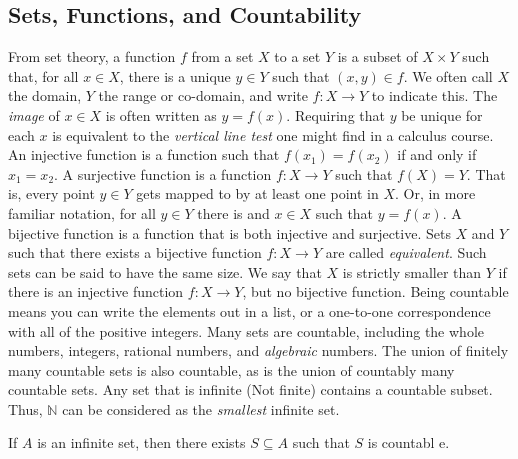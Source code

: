     \subsection{Sets, Functions, and Countability}
        From set theory, a function $f$ from a set $X$ to a
        set $Y$ is a subset of $X\times{Y}$ such that, for
        all $x\in{X}$, there is a unique $y\in{Y}$
        such that $(x,y)\in{f}$. We often call $X$ the
        domain, $Y$ the range or co-domain, and write
        $f:X\rightarrow{Y}$ to indicate this. The
        \textit{image} of $x\in{X}$ is often written
        as $y=f(x)$. Requiring that $y$ be unique for each
        $x$ is equivalent to the \textit{vertical line test}
        one might find in a calculus course.
        An injective function is a function such
        that $f(x_{1})=f(x_{2})$ if and only if $x_{1}=x_{2}$.
        A surjective function is a function $f:X\rightarrow{Y}$
        such that $f(X)=Y$. That is, every point $y\in{Y}$
        gets mapped to by at least one point in $X$. Or, in
        more familiar notation, for all $y\in{Y}$ there is
        and $x\in{X}$ such that $y=f(x)$. A bijective
        function is a function that is both injective and
        surjective. Sets $X$ and $Y$ such that there
        exists a bijective function $f:X\rightarrow{Y}$ are
        called \textit{equivalent}. Such sets can be said
        to have the same size. We say that $X$ is strictly
        smaller than $Y$ if there is an injective function
        $f:X\rightarrow{Y}$, but no bijective function.
        Being countable means you can write
        the elements out in a list, or a
        one-to-one correspondence with all of
        the positive integers. Many sets are countable,
        including the whole numbers, integers, rational
        numbers, and \textit{algebraic} numbers. The
        union of finitely many countable sets is also
        countable, as is the union of countably many
        countable sets.
        Any set that is infinite (Not finite) contains a
        countable subset. Thus, $\mathbb{N}$ can be
        considered as the \textit{smallest} infinite set.
        \begin{theorem}
            If $A$ is an infinite set, then there exists
            $S\subseteq{A}$ such that $S$ is countabl e.
        \end{theorem}
